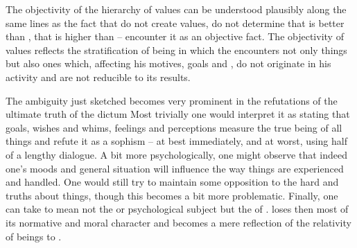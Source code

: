 %
The {objectivity} of the hierarchy of values can be understood plausibly along
the same lines as the fact that  do not create values,  do not
determine that  is better than , that  is higher
than  --  encounter it as an {objective} fact.  The objectivity of values
reflects the stratification of being in which the  encounters
not only  things but also ones which, affecting his motives, goals
and , do not originate in his activity and are not reducible to its
results.

\label{pa:SelfEgo}
The ambiguity just sketched becomes very prominent in the 
refutations of the ultimate truth of the dictum   Most trivially one would interpret it as stating that
 goals, wishes and whims, feelings and perceptions measure the
true being of all things and refute it as a sophism -- at best immediately, and
at worst, using half of a lengthy dialogue. A bit more psychologically, one might
observe that indeed one's moods and general situation will influence the way
things are experienced and handled. One would still try to maintain some
opposition to the hard and  truths about things, though
this becomes a bit more problematic.  Finally, one can take  to mean not
the  or psychological subject but the  of .  loses then most of its normative and moral
character and becomes a mere reflection of the relativity of beings to
.
  
